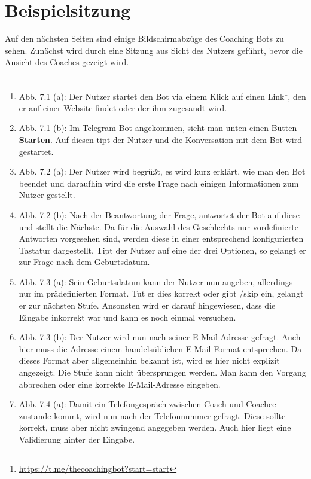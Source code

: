 \label{Beispiele}
\chapter{Beispielsitzung}

	Auf den nächsten Seiten sind einige Bildschirmabzüge des Coaching Bots zu sehen. Zunächst wird durch eine Sitzung aus Sicht des Nutzers geführt, bevor die Ansicht des Coaches gezeigt wird.\\ 
	\\
	\begin{enumerate}
		\item Abb. 7.1 (a): Der Nutzer startet den Bot via einem Klick auf einen Link\footnote{\url{https://t.me/thecoachingbot?start=start}}, den er auf einer Website findet oder der ihm zugesandt wird.
		\item Abb. 7.1 (b): Im Telegram-Bot angekommen, sieht man unten einen Butten \textbf{Starten}. Auf diesen tipt der Nutzer und die Konversation mit dem Bot wird gestartet.
		\item Abb. 7.2 (a): Der Nutzer wird begrüßt, es wird kurz erklärt, wie man den Bot beendet und daraufhin wird die erste Frage nach einigen Informationen zum Nutzer gestellt.
		\item Abb. 7.2 (b): Nach der Beantwortung der Frage, antwortet der Bot auf diese und stellt die Nächste. Da für die Auswahl des Geschlechts nur vordefinierte Antworten vorgesehen sind, werden diese in einer entsprechend konfigurierten Tastatur dargestellt. Tipt der Nutzer auf eine der drei Optionen, so gelangt er zur Frage nach dem Geburtsdatum.
		\item Abb. 7.3 (a): Sein Geburtsdatum kann der Nutzer nun angeben, allerdings nur im prädefinierten Format. Tut er dies korrekt oder gibt /skip ein, gelangt er zur nächsten Stufe. Ansonsten wird er darauf hingewiesen, dass die Eingabe inkorrekt war und kann es noch einmal versuchen. 
		\item Abb. 7.3 (b): Der Nutzer wird nun nach seiner E-Mail-Adresse gefragt. Auch hier muss die Adresse einem handelsüblichen E-Mail-Format entsprechen. Da dieses Format aber allgemeinhin bekannt ist, wird es hier nicht explizit angezeigt. Die Stufe kann nicht übersprungen werden. Man kann den Vorgang abbrechen oder eine korrekte E-Mail-Adresse eingeben.
		\item Abb. 7.4 (a): Damit ein Telefongespräch zwischen Coach und Coachee zustande kommt, wird nun nach der Telefonnummer gefragt. Diese sollte korrekt, muss aber nicht zwingend angegeben werden. Auch hier liegt eine Validierung hinter der Eingabe. 

\end{enumerate}
